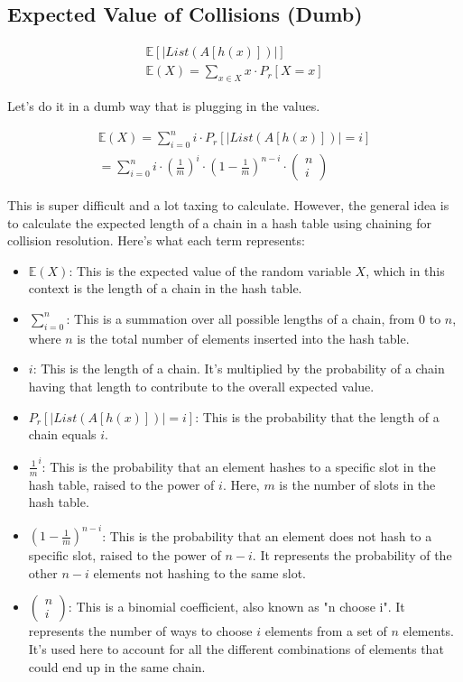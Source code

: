 \documentclass{article}
\begin{document}
\subsection{Expected Value of Collisions (Dumb)}

\begin{align*}
    \mathbb E[|List(A[h(x)])|]  \\
    \mathbb E(X) = \sum_{x \in X} x \cdot P_r[X = x]
\end{align*}

Let's do it in a dumb way that is plugging in the values.

\begin{align*}
    \mathbb E(X) = \sum_{i=0}^{n} i \cdot P_r[|List(A[h(x)])| = i] \\
    = \sum_{i=0}^{n} i \cdot \left(\frac{1}{m}\right)^i \cdot \left(1-\frac{1}{m}\right)^{n-i} \cdot \left(\begin{matrix}
        n \\
        i
    \end{matrix}\right)
\end{align*}

This is super difficult and a lot taxing to calculate. However, the general idea is to calculate the expected length of a chain in a hash table using chaining for collision resolution. Here's what each term represents:
\begin{itemize}
    \item $\mathbb E(X)$: This is the expected value of the random variable $X$, which in this context is the length of a chain in the hash table.
    \item $\sum_{i=0}^{n}$: This is a summation over all possible lengths of a chain, from 0 to $n$, where $n$ is the total number of elements inserted into the hash table.
    \item $i$: This is the length of a chain. It's multiplied by the probability of a chain having that length to contribute to the overall expected value.
    \item $P_r[|List(A[h(x)])| = i]$: This is the probability that the length of a chain equals $i$.
    \item $\frac{1}{m}^i$: This is the probability that an element hashes to a specific slot in the hash table, raised to the power of $i$. Here, $m$ is the number of slots in the hash table.
    \item $(1-\frac{1}{m})^{n-i}$: This is the probability that an element does not hash to a specific slot, raised to the power of $n-i$. It represents the probability of the other $n-i$ elements not hashing to the same slot.
    \item $\left(\begin{matrix}  n \\
        i
    \end{matrix}\right)$: This is a binomial coefficient, also known as "n choose i". It represents the number of ways to choose $i$ elements from a set of $n$ elements. It's used here to account for all the different combinations of elements that could end up in the same chain.
\end{itemize}
\end{document}
